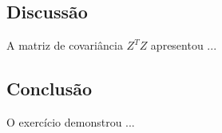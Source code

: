 \documentclass[12pt,a4paper]{article}
\begin{document}
\subsection{Discussão}

A matriz de covariância $Z^T Z$ apresentou ...

\subsection{Conclusão}

O exercício demonstrou ...




\end{document}
